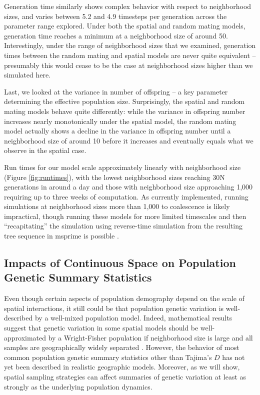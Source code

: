 \documentclass[10pt,twoside,lineno,hidelinks]{preprint}
\begin{document}
Generation time similarly shows complex behavior with respect to neighborhood sizes, and varies between 5.2 and 4.9 timesteps per generation across the parameter range explored. 
Under both the spatial and random mating models, 
generation time reaches a minimum at a neighborhood size of around 50. 
Interestingly, under the range of neighborhood sizes that we examined, generation times between the random mating and spatial models are never quite equivalent -- presumably this would cease to be the case at neighborhood sizes higher than we simulated here.

Last, we looked at the variance in number of offspring -- a key parameter determining the effective population size. 
Surprisingly, the spatial and random mating models behave quite differently: 
while the variance in offspring number increases nearly monotonically under the spatial model, the random mating model actually shows a decline in the variance in offspring number until a neighborhood size of around 10 before it increases and eventually equals what we observe in the spatial case. 

Run times for our model scale approximately linearly with neighborhood size (Figure \ref{fig:runtimes}), with the lowest neighborhood sizes reaching 30N generations in around a day and those with neighborhood size approaching 1,000 requiring up to three weeks of computation. As currently implemented, running simulations at neighborhood sizes more than 1,000 to coalescence is likely impractical, though running these models for more limited timescales and then ``recapitating'' the simulation using reverse-time simulation from the resulting tree sequence in msprime is possible \citep{haller2019treesequence}.  


\subsection{Impacts of Continuous Space on Population Genetic Summary Statistics}

Even though certain aspects of population demography depend on the scale of spatial interactions, it still could be that population genetic variation is well-described by a well-mixed population model. Indeed, mathematical results suggest that genetic variation in some spatial models should be well-approximated by a Wright-Fisher population if neighborhood size is large and all samples are geographically widely separated \citep{wilkins2004separation,zahle2005stepping}. However, the behavior of most common population genetic summary statistics other than Tajima's $D$ \citep{Stadler2009} has not yet been described in realistic geographic models. Moreover, as we will show, spatial sampling strategies can affect summaries of genetic variation at least as strongly as the underlying population dynamics. 
\end{document}
